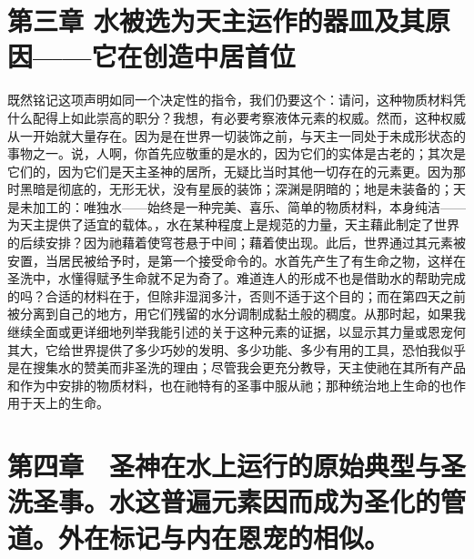
\section{第三章 水被选为天主运作的器皿及其原因——它在创造中居首位}

既然铭记这项声明如同一个决定性的指令，我们仍要这个：请问，这种物质材料凭什么配得上如此崇高的职分？我想，有必要考察液体元素的权威。然而，这种权威从一开始就大量存在。因为是在世界一切装饰之前，与天主一同处于未成形状态的事物之一。说，人啊，你首先应敬重的是水的，因为它们的实体是古老的；其次是它们的，因为它们是天主圣神的居所，无疑比当时其他一切存在的元素更。因为那时黑暗是彻底的，无形无状，没有星辰的装饰；深渊是阴暗的；地是未装备的；天是未加工的：唯独水——始终是一种完美、喜乐、简单的物质材料，本身纯洁——为天主提供了适宜的载体。，水在某种程度上是规范的力量，天主藉此制定了世界的后续安排？因为祂藉着使穹苍悬于中间；藉着使出现。此后，世界通过其元素被安置，当居民被给予时，是第一个接受命令的。水首先产生了有生命之物，这样在圣洗中，水懂得赋予生命就不足为奇了。难道连人的形成不也是借助水的帮助完成的吗？合适的材料在于，但除非湿润多汁，否则不适于这个目的；而在第四天之前被分离到自己的地方，用它们残留的水分调制成黏土般的稠度。从那时起，如果我继续全面或更详细地列举我能引述的关于这种元素的证据，以显示其力量或恩宠何其大，它给世界提供了多少巧妙的发明、多少功能、多少有用的工具，恐怕我似乎是在搜集水的赞美而非圣洗的理由；尽管我会更充分教导，天主使祂在其所有产品和作为中安排的物质材料，也在祂特有的圣事中服从祂；那种统治地上生命的也作用于天上的生命。\par


\section{第四章　圣神在水上运行的原始典型与圣洗圣事。水这普遍元素因而成为圣化的管道。外在标记与内在恩宠的相似。}


